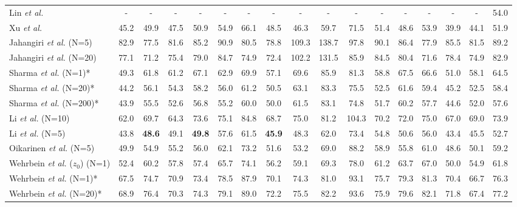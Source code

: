 \documentclass[letterpaper, 10 pt, conference]{ieeeconf}
\begin{document}
\begin{table*}[t]
{\begin{tabular}{l|ccccccccccccccc|c}
        Lin \textit{et al.} \cite{lin2021end} & -& -& - &-& -& -& -& - &- &- &- &- &-& -& -& 54.0\\
        Xu \textit{et al.} \cite{xu2021graph} & 45.2& 49.9& 47.5& 50.9& 54.9& 66.1& 48.5& 46.3& 59.7& 71.5& 51.4& 48.6& 53.9& 39.9& 44.1& 51.9\\
        \hline
        Jahangiri \textit{et al.} \cite{jahangiri2017generating} (N=5)  & 82.9 & 77.5 & 81.6 & 85.2 & 90.9 & 80.5 & 78.8 & 109.3 & 138.7 & 97.8 & 90.1 & 86.4 & 77.9 & 85.5 & 81.5 & 89.2 \\
        Jahangiri \textit{et al.} \cite{jahangiri2017generating} (N=20)   & 77.1 & 71.2 & 75.4 & 79.0 & 84.7 & 74.9 & 72.4 & 102.2 & 131.5 & 85.9 & 84.5 & 80.4 & 71.6 & 78.4 & 74.9 & 82.9 \\
        Sharma \textit{et al.} \cite{sharma2019monocular} (N=1)*  & 49.3 & 61.8 & 61.2 & 67.1 & 62.9 & 69.9 & 57.1 & 69.6 & 85.9 & 81.3 & 58.8 & 67.5 & 66.6 & 51.0 & 58.1 & 64.5 \\
        Sharma \textit{et al.} \cite{sharma2019monocular} (N=20)* & 44.2 & 56.1 & 54.3 & 58.2 & 56.0 & 61.2 & 50.5 & 63.1 & 83.3 & 75.5 & 52.5 & 61.6 & 59.4 & 45.2 & 52.5 & 58.4 \\
        Sharma \textit{et al.} \cite{sharma2019monocular} (N=200)*  & 43.9 & 55.5 & 52.6 & 56.8 & 55.2 & 60.0 & 50.0 & 61.5 & 83.1 & 74.8 & 51.7 & 60.2 & 57.7 & 44.6 & 52.0 & 57.6 \\
        Li \textit{et al.} (N=10) \cite{li2020weakly} &62.0 &69.7& 64.3& 73.6& 75.1& 84.8& 68.7& 75.0& 81.2& 104.3& 70.2& 72.0& 75.0& 67.0& 69.0& 73.9 \\   
        Li \textit{et al.} (N=5) \cite{li2019generating} & 43.8 & \textbf{48.6} & 49.1 & \textbf{49.8} & 57.6 & 61.5 & \textbf{45.9} & 48.3 & 62.0 & 73.4 & 54.8 & 50.6 & 56.0 & 43.4 & 45.5 & 52.7\\
        Oikarinen \textit{et al.} \cite{oikarinen2021graphmdn} (N=5)  & 49.9 & 54.9 & 55.2 & 56.0 & 62.1 & 73.2 & 51.6 & 53.2 & 69.0 & 88.2 & 58.9 & 55.8 & 61.0 & 48.6 & 50.1 & 59.2 \\
        Wehrbein \textit{et al.} \cite{wehrbein2021probabilistic} ($z_0$) (N=1) & 52.4 & 60.2 & 57.8 & 57.4 & 65.7 & 74.1 & 56.2 & 59.1 & 69.3 & 78.0 & 61.2 & 63.7 & 67.0 & 50.0 & 54.9 & 61.8 \\
        Wehrbein \textit{et al.} \cite{wehrbein2021probabilistic} (N=1)* & 67.5 & 74.7 & 70.9 & 73.4 & 78.5 & 87.9 & 70.1 & 74.3 & 81.0 & 93.1 & 75.7 & 79.3 & 81.3 & 70.4 & 66.7& 76.3\\
        Wehrbein \textit{et al.} \cite{wehrbein2021probabilistic} (N=20)* & 68.9 & 76.4 & 70.3 & 74.3 & 79.1 & 89.0 & 72.2 & 75.5 & 82.2 & 93.6 & 75.9 & 79.6 & 82.1 & 71.8 & 67.4 & 77.2\\

\end{tabular}}
\end{table*}
\end{document}
